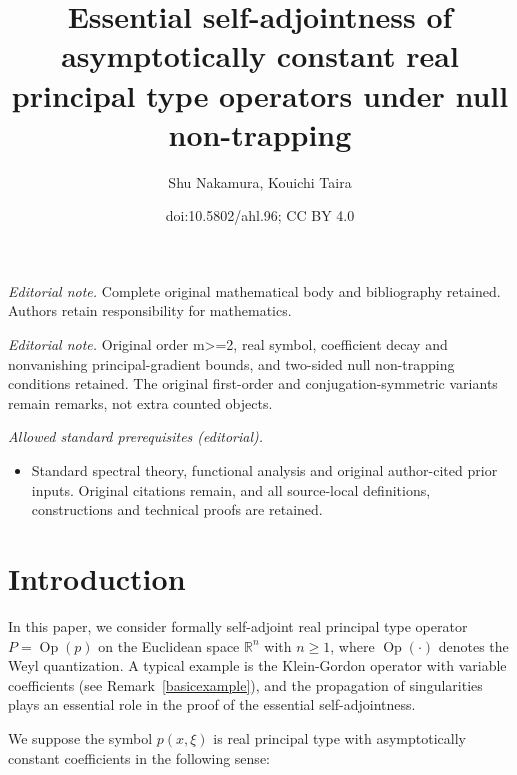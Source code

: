 \documentclass[10pt]{amsart}
\title{Essential self-adjointness of asymptotically constant real principal type operators under null non-trapping}
\author{Shu Nakamura, Kouichi Taira}
\date{doi:10.5802/ahl.96; CC BY 4.0}
\theoremstyle{definition}
\newcommand*\x{\xi}
\DeclareMathOperator{\Op}{Op}
\newcommand*\re{\mathbb{R}}
\begin{document}
\maketitle
\noindent\textit{Editorial note.} Complete original mathematical body and bibliography retained. Authors retain responsibility for mathematics.\par\medskip
\noindent\textit{Editorial note.} Original order m>=2, real symbol, coefficient decay and nonvanishing principal-gradient bounds, and two-sided null non-trapping conditions retained. The original first-order and conjugation-symmetric variants remain remarks, not extra counted objects.\par\medskip
\noindent\textit{Allowed standard prerequisites (editorial).}\begin{itemize}
\item Standard spectral theory, functional analysis and original author-cited prior inputs. Original citations remain, and all source-local definitions, constructions and technical proofs are retained.
\end{itemize}\medskip
\section{Introduction}
In this paper, we consider formally self-adjoint real principal type operator $P=\Op(p)$ on the Euclidean space $\re^n$ with $n\geq 1$, where $\Op(\cdot)$ denotes the Weyl quantization. A typical example is the Klein-Gordon operator with variable coefficients (see Remark~\ref{basicexample}), and the propagation of singularities plays an essential role in the proof of the essential self-adjointness.

We suppose the symbol $p(x,\x)$ is real principal type with asymptotically constant coefficients in the following sense:
\end{document}
